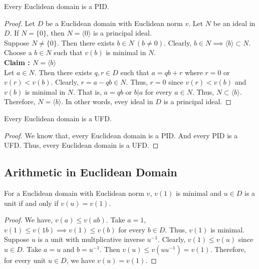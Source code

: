 \begin{theorem}
	Every Euclidean domain is a PID.
\end{theorem}
\begin{proof}
	Let $D$ be a Euclidean domain with Euclidean norm $v$.
	Let $N$ be an ideal in $D$.
	If $N = \{ 0\}$, then $N = \langle 0 \rangle$ is a principal ideal.\\

	Suppose $N \ne \{ 0 \}$.
	Then there exists $b \in N\ (b \ne 0)$.
	Clearly, $b \in N \implies \langle b \rangle \subset N$.
	Choose a $b \in N$ such that $v(b)$ is minimal in $N$.\\

	\textbf{Claim : $N = \langle b \rangle$}\\
	Let $a \in N$.
	Then there exists $q,r \in D$ such that $a = qb + r$ where $r = 0$ or $v(r) < v(b)$.
	Clearly, $r = a-qb \in N$.
	Thus, $r = 0$ since $v(r) < v(b)$ and $v(b)$ is minimal in $N$.
	That is, $a = qb$ or $b|a$ for every $a \in N$.
	Thus, $N \subset \langle b \rangle$.
	Therefore, $N = \langle b \rangle$.
	In other words, evey ideal in $D$ is a principal ideal.
\end{proof}

\begin{corollary}
	Every Euclidean domain is a UFD.
\end{corollary}
\begin{proof}
	We know that, every Euclidean domain is a PID.
	And every PID is a UFD.
	Thus, every Euclidean domain is a UFD.
\end{proof}
\subsection{Arithmetic in Euclidean Domain}
\begin{theorem}
	For a Euclidean domain with Euclidean norm $v$, $v(1)$ is minimal and $u \in D$ is a unit if and only if $v(u) = v(1)$.
\end{theorem}
\begin{proof}
	We have, $v(a) \le v(ab)$.
	Take $a = 1$, $v(1) \le v(1b) \implies v(1) \le v(b)$ for every $b \in D$.
	Thus, $v(1)$ is minimal.\\

	Suppose $u$ is a unit with multplicative inverse $u^{-1}$.
	Clearly, $v(1) \le v(u)$ since $u \in D$.
	Take $a = u$ and $b = u^{-1}$.
	Then $v(u) \le v(uu^{-1}) = v(1)$.
	Therefore, for every unit $u \in D$, we have $v(u) = v(1)$.
\end{proof}

